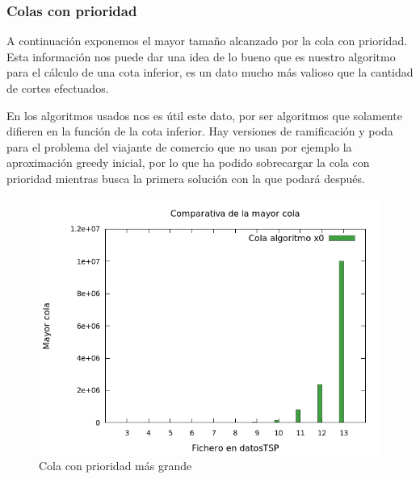 \subsubsection{Colas con prioridad}
A continuación exponemos el mayor tamaño alcanzado por la cola con prioridad.
Esta información nos puede dar una idea de lo bueno que es nuestro algoritmo para el cálculo
de una cota inferior, es un dato mucho más valioso que la cantidad de cortes efectuados.

En los algoritmos usados nos es útil este dato, por ser algoritmos que solamente difieren en
la función de la cota inferior. Hay versiones de ramificación y poda para el problema del viajante
de comercio que no usan por ejemplo la aproximación greedy inicial, por lo que ha podido 
sobrecargar la cola con prioridad mientras busca la primera solución con la que podará después.

\begin{figure}[H]
    \centering
    \includegraphics[scale=0.65]{../TSP/Graficas/graficaColaMaxima.png}
    \caption{Cola con prioridad más grande}
\end{figure}


